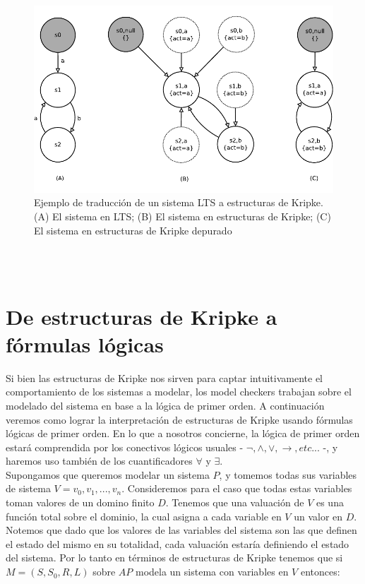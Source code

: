 \documentclass[titlepage, 12pt]{book}
\begin{document}
\begin{figure}[htp]
  \centering
    \includegraphics{Imagenes/ltsakripke.pdf}
  \caption{Ejemplo de traducci\'on de un sistema LTS a estructuras de Kripke. (A) El sistema en LTS; (B) El sistema en estructuras de Kripke; (C) El sistema en estructuras de Kripke depurado}
  \label{ltsakripke}
\end{figure}
~\\\\






\section{De estructuras de Kripke a f\'ormulas l\'ogicas}


Si bien las estructuras de Kripke nos sirven para captar intuitivamente el comportamiento de los sistemas a modelar, los model checkers trabajan sobre el modelado del sistema en base a la l\'ogica de primer orden. A continuaci\'on veremos como lograr la interpretaci\'on de estructuras de Kripke usando f\'ormulas l\'ogicas de primer orden. En lo que a nosotros concierne, la l\'ogica de primer orden estar\'a comprendida por los conectivos l\'ogicos usuales - $\neg,\wedge,\vee,\rightarrow,etc...$ -, y haremos uso tambi\'en de los cuantificadores $\forall$ y $\exists$.\\

Supongamos que queremos modelar un sistema $P$, y tomemos todas sus variables de sistema $V = {v_0,v_1,...,v_n}$. Consideremos para el caso que todas estas variables toman valores de un domino finito $D$. Tenemos que una valuaci\'on de $V$ es una funci\'on total sobre el dominio, la cual asigna a cada variable en $V$ un valor en $D$. Notemos que dado que los valores de las variables del sistema son las que definen el estado del mismo en su totalidad, cada valuaci\'on estar\'ia definiendo el estado del sistema. Por lo tanto en t\'erminos de estructuras de Kripke tenemos que si $M = (S,S_0,R,L)$ sobre $AP$ modela un sistema con variables en $V$ entonces:
\end{document}
